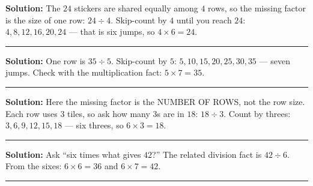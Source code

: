 \documentclass[12pt]{article}
\begin{document}



\textbf{Solution:} The $24$ stickers are shared equally among $4$ rows, so the missing factor is the
size of one row: $24 \div 4$. Skip-count by $4$ until you reach $24$: $4, 8, 12, 16, 20, 24$ --- that is
six jumps, so $4 \times 6 = 24$. 

\vspace{0.15cm}\noindent\rule{\linewidth}{0.2pt}


\textbf{Solution:} One row is $35 \div 5$. Skip-count by $5$: $5, 10, 15, 20, 25, 30, 35$ --- seven jumps.
Check with the multiplication fact: $5 \times 7 = 35$. 

\vspace{0.15cm}\noindent\rule{\linewidth}{0.2pt}


\textbf{Solution:} Here the missing factor is the NUMBER OF ROWS, not the row size. Each row uses
$3$ tiles, so ask how many $3$s are in $18$: $18 \div 3$. Count by threes: $3, 6, 9, 12, 15, 18$ --- six
threes, so $6 \times 3 = 18$. 

\vspace{0.15cm}\noindent\rule{\linewidth}{0.2pt}


\textbf{Solution:} Ask ``six times what gives $42$?'' The related division fact is $42 \div 6$.
From the sixes: $6 \times 6 = 36$ and $6 \times 7 = 42$. 

\vspace{0.15cm}\noindent\rule{\linewidth}{0.2pt}

\end{document}
